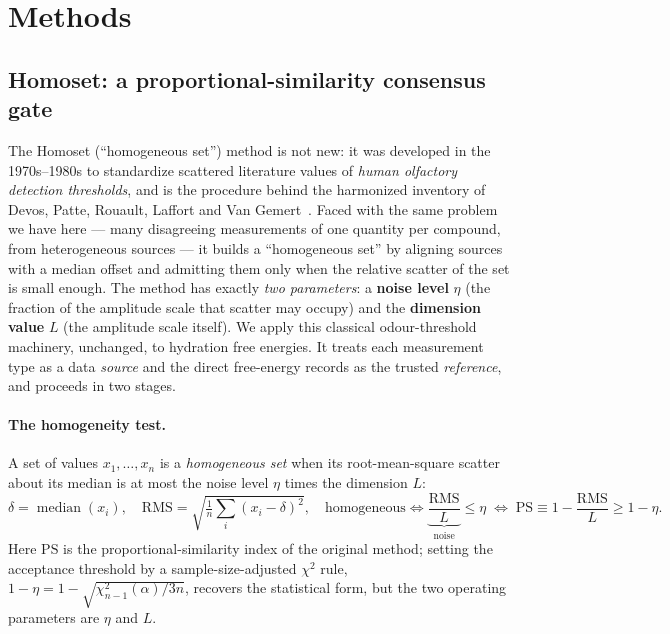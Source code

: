 \documentclass[11pt]{article}
\begin{document}
\section{Methods}

\subsection{Homoset: a proportional-similarity consensus gate}
The Homoset (``homogeneous set'') method is not new: it was developed in the 1970s--1980s to
standardize scattered literature values of \emph{human olfactory detection thresholds}, and is
the procedure behind the harmonized inventory of Devos, Patte, Rouault, Laffort and Van
Gemert~\cite{devos1990}. Faced with the same problem we have here --- many disagreeing
measurements of one quantity per compound, from heterogeneous sources --- it builds a
``homogeneous set'' by aligning sources with a median offset and admitting them only when the
relative scatter of the set is small enough. The method has exactly \emph{two parameters}: a
\textbf{noise level} $\eta$ (the fraction of the amplitude scale that scatter may occupy) and
the \textbf{dimension value} $L$ (the amplitude scale itself). We apply this classical
odour-threshold machinery, unchanged, to hydration free energies. It treats each measurement
type as a data \emph{source} and the direct free-energy records as the trusted \emph{reference},
and proceeds in two stages.

\paragraph{The homogeneity test.} A set of values $x_1,\dots,x_n$ is a \emph{homogeneous set}
when its root-mean-square scatter about its median is at most the noise level $\eta$ times the
dimension $L$:
\begin{equation}
\delta = \operatorname{median}(x_i), \quad
\mathrm{RMS} = \sqrt{\tfrac{1}{n}\textstyle\sum_i (x_i-\delta)^2}, \quad
\text{homogeneous} \iff \underbrace{\frac{\mathrm{RMS}}{L}}_{\text{noise}} \le \eta
\;\Longleftrightarrow\; \mathrm{PS} \equiv 1-\frac{\mathrm{RMS}}{L} \ge 1-\eta .
\label{eq:ps}
\end{equation}
Here $\mathrm{PS}$ is the proportional-similarity index of the original method; setting the
acceptance threshold by a sample-size-adjusted $\chi^2$ rule, $1-\eta = 1-\sqrt{\chi^2_{n-1}(\alpha)/3n}$,
recovers the statistical form, but the two operating parameters are $\eta$ and $L$.
\end{document}
